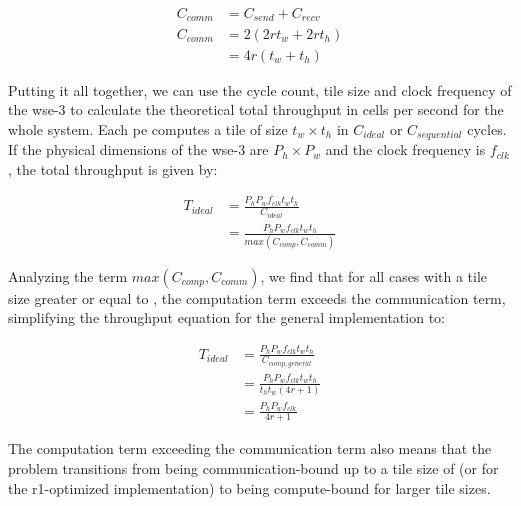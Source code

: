 \begin{equation}
    \label{eq:c_comm}
    \begin{aligned}
        C_{comm} &= C_{send} + C_{recv} \\[0.5ex]
        C_{comm} &= 2\left(2 r t_w + 2 r t_h\right) \\[0.5ex]
        &= 4r\left(t_w+t_h\right)
    \end{aligned}
\end{equation}

Putting it all together, we can use the cycle count, tile size and clock frequency of the \ac{wse}-3 to calculate the theoretical total throughput in cells per second for the whole system. Each \ac{pe} computes a tile of size $t_w \times t_h$ in $C_{ideal}$ or $C_{sequential}$ cycles. If the physical dimensions of the \ac{wse}-3 are $P_h \times P_w$ and the clock frequency is $f_{clk}$, the total throughput is given by:

\begin{equation}
    \label{eq:throughput_ideal}
    \begin{aligned}
        T_{ideal} &= \frac{P_h P_w f_{clk} t_w t_h}{C_{ideal}} \\[0.5ex]
        &= \frac{P_h P_w f_{clk} t_w t_h}{max\left(C_{comp}, C_{comm}\right)}
    \end{aligned}
\end{equation}

Analyzing the term $max\left(C_{comp}, C_{comm}\right)$, we find that for all cases with a tile size greater or equal to , the computation term exceeds the communication term, simplifying the throughput equation for the general implementation to:

\begin{equation}
    \label{eq:throughput_ideal_simplified}
    \begin{aligned}
        T_{ideal} &= \frac{P_h P_w f_{clk} t_w t_h}{C_{comp,general}} \\[0.5ex]
        &= \frac{P_h P_w f_{clk} t_w t_h}{t_h t_w \left(4r + 1\right)} \\[0.5ex]
        &= \frac{P_h P_w f_{clk}}{4r + 1}
    \end{aligned}
\end{equation}

The computation term exceeding the communication term also means that the problem transitions from being communication-bound up to a tile size of  (or  for the r1-optimized implementation) to being compute-bound for larger tile sizes.

